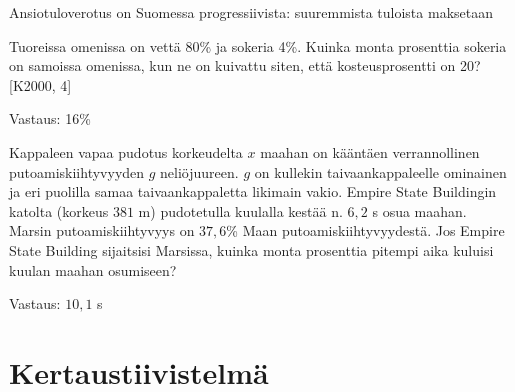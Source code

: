 Ansiotuloverotus on Suomessa progressiivista: suuremmista tuloista maksetaan

\begin{tehtava}
Tuoreissa omenissa on vettä 80\% ja sokeria 4\%. Kuinka monta prosenttia sokeria on samoissa omenissa, kun ne on kuivattu siten, että kosteusprosentti on 20? [K2000, 4]
\begin{vastaus}
Vastaus: 16\%
\end{vastaus}
\end{tehtava}

\begin{tehtava}
Kappaleen vapaa pudotus korkeudelta $x$ maahan on kääntäen verrannollinen putoamiskiihtyvyyden $g$ neliöjuureen. $g$ on kullekin taivaankappaleelle ominainen ja eri puolilla samaa taivaankappaletta likimain vakio. Empire State Buildingin katolta (korkeus $381$ m) pudotetulla kuulalla kestää n. $6,2$ s osua maahan. Marsin putoamiskiihtyvyys on $37,6$\%  Maan putoamiskiihtyvyydestä. Jos Empire State Building sijaitsisi Marsissa, kuinka monta prosenttia pitempi aika kuluisi kuulan maahan osumiseen?
\begin{vastaus}
Vastaus: $10,1$ s
\end{vastaus}
\end{tehtava}

%
%
\chapter{Kertaustiivistelmä}
